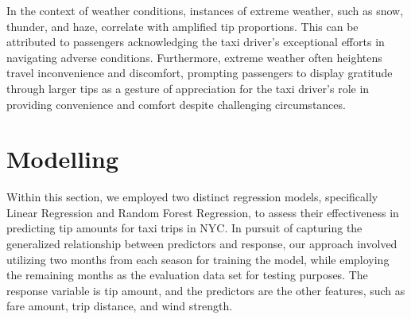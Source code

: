 \documentclass[11pt]{article}
\begin{document}
In the context of weather conditions, instances of extreme weather, such as snow, thunder, and haze, correlate with amplified tip proportions. This can be attributed to passengers acknowledging the taxi driver's exceptional efforts in navigating adverse conditions. Furthermore, extreme weather often heightens travel inconvenience and discomfort, prompting passengers to display gratitude through larger tips as a gesture of appreciation for the taxi driver's role in providing convenience and comfort despite challenging circumstances. 

\section{Modelling}
Within this section, we employed two distinct regression models, specifically Linear Regression and Random Forest Regression, to assess their effectiveness in predicting tip amounts for taxi trips in NYC. In pursuit of capturing the generalized relationship between predictors and response, our approach involved utilizing two months from each season for training the model, while employing the remaining months as the evaluation data set for testing purposes. The response variable is tip amount, and the predictors are the other features, such as fare amount, trip distance, and wind strength.
\end{document}
